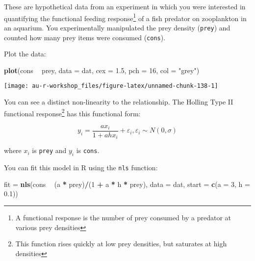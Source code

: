 \documentclass[]{book}
\newenvironment{Shaded}{\begin{snugshade}}{\end{snugshade}}
\newcommand{\KeywordTok}[1]{\textcolor[rgb]{0.13,0.29,0.53}{\textbf{#1}}}
\newcommand{\DataTypeTok}[1]{\textcolor[rgb]{0.13,0.29,0.53}{#1}}
\newcommand{\DecValTok}[1]{\textcolor[rgb]{0.00,0.00,0.81}{#1}}
\newcommand{\FloatTok}[1]{\textcolor[rgb]{0.00,0.00,0.81}{#1}}
\newcommand{\StringTok}[1]{\textcolor[rgb]{0.31,0.60,0.02}{#1}}
\newcommand{\OperatorTok}[1]{\textcolor[rgb]{0.81,0.36,0.00}{\textbf{#1}}}
\newcommand{\NormalTok}[1]{#1}
\let\rmarkdownfootnote\footnote%
\def\footnote{\protect\rmarkdownfootnote}
\theoremstyle{definition}
\theoremstyle{definition}
\theoremstyle{definition}
\theoremstyle{remark}
\begin{document}
These are hypothetical data from an experiment in which you were
interested in quantifying the functional feeding response\footnote{A
  functional response is the number of prey consumed by a predator at
  various prey densities} of a fish predator on zooplankton in an
aquarium. You experimentally manipulated the prey density
(\texttt{prey}) and counted how many prey items were consumed
(\texttt{cons}).

Plot the data:

\begin{Shaded}
\begin{Highlighting}[]
\KeywordTok{plot}\NormalTok{(cons }\OperatorTok{~}\StringTok{ }\NormalTok{prey, }\DataTypeTok{data =}\NormalTok{ dat, }\DataTypeTok{cex =} \FloatTok{1.5}\NormalTok{, }\DataTypeTok{pch =} \DecValTok{16}\NormalTok{, }\DataTypeTok{col =} \StringTok{"grey"}\NormalTok{)}
\end{Highlighting}
\end{Shaded}

\begin{center}\texttt{[image: au-r-workshop\_files/figure-latex/unnamed-chunk-138-1]} \end{center}

You can see a distinct non-linearity to the relationship. The Holling
Type II functional response\footnote{This function rises quickly at low
  prey densities, but saturates at high densities} has this functional
form:

\begin{equation}
  y_i=\frac{ax_i}{1+ahx_i} + \varepsilon_i, \varepsilon_i \sim N(0, \sigma)
\label{eq:func-resp}
\end{equation}

where \(x_i\) is \texttt{prey} and \(y_i\) is \texttt{cons}.

You can fit this model in R using the \texttt{nls} function:

\begin{Shaded}
\begin{Highlighting}[]
\NormalTok{fit =}\StringTok{ }\KeywordTok{nls}\NormalTok{(cons }\OperatorTok{~}\StringTok{ }\NormalTok{(a }\OperatorTok{*}\StringTok{ }\NormalTok{prey)}\OperatorTok{/}\NormalTok{(}\DecValTok{1} \OperatorTok{+}\StringTok{ }\NormalTok{a }\OperatorTok{*}\StringTok{ }\NormalTok{h }\OperatorTok{*}\StringTok{ }\NormalTok{prey), }\DataTypeTok{data =}\NormalTok{ dat,}
          \DataTypeTok{start =} \KeywordTok{c}\NormalTok{(}\DataTypeTok{a =} \DecValTok{3}\NormalTok{, }\DataTypeTok{h =} \FloatTok{0.1}\NormalTok{))}
\end{Highlighting}
\end{Shaded}
\end{document}
